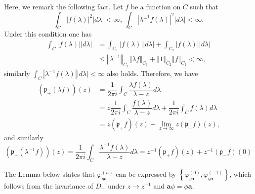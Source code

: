 \documentclass[a4paper]{article}%
\begin{document}
Here, we remark the following fact. Let $f$ be a function on $C$ such that%
\[
\int_{C}\left\vert f\left(  \lambda\right)  \right\vert ^{2}\left\vert
d\lambda\right\vert <\infty\text{, \ }\int_{C}\left\vert \lambda^{\pm
1}f\left(  \lambda\right)  \right\vert ^{2}\left\vert d\lambda\right\vert
<\infty\text{.}%
\]
Under this condition one has%
\begin{align*}
\int_{C}\left\vert f\left(  \lambda\right)  \right\vert \left\vert
d\lambda\right\vert  &  =\int_{C_{1}}\left\vert f\left(  \lambda\right)
\right\vert \left\vert d\lambda\right\vert +\int_{C_{2}}\left\vert f\left(
\lambda\right)  \right\vert \left\vert d\lambda\right\vert \\
&  \leq\left\Vert \lambda^{-1}\right\Vert _{C_{1}}\left\Vert \lambda
f\right\Vert _{C_{1}}+\left\Vert 1\right\Vert _{C_{2}}\left\Vert f\right\Vert
_{C_{2}}<\infty\text{,}%
\end{align*}
similarly $\int_{C}\left\vert \lambda^{-1}f\left(  \lambda\right)  \right\vert
\left\vert d\lambda\right\vert <\infty$ also holds. Therefore, we have%
\begin{align}
\left(  \mathfrak{p}_{+}\left(  \lambda f\right)  \right)  \left(  z\right)
&  =\dfrac{1}{2\pi i}\int_{C}\dfrac{\lambda f\left(  \lambda\right)  }%
{\lambda-z}d\lambda\nonumber\\
&  =z\dfrac{1}{2\pi i}\int_{C}\dfrac{f\left(  \lambda\right)  }{\lambda
-z}d\lambda+\dfrac{1}{2\pi i}\int_{C}f\left(  \lambda\right)  d\lambda
\nonumber\\
&  =z\left(  \mathfrak{p}_{+}f\right)  \left(  z\right)  +\lim_{z\rightarrow
\infty}z\left(  \mathfrak{p}_{-}f\right)  \left(  z\right)  \text{,}
\label{2-21}%
\end{align}
and similarly%
\begin{equation}
\left(  \mathfrak{p}_{+}\left(  \lambda^{-1}f\right)  \right)  \left(
z\right)  =\dfrac{1}{2\pi i}\int_{C}\dfrac{\lambda^{-1}f\left(  \lambda
\right)  }{\lambda-z}d\lambda=z^{-1}\left(  \mathfrak{p}_{+}f\right)  \left(
z\right)  +z^{-1}\left(  \mathfrak{p}_{-}f\right)  \left(  0\right)
\label{2-22}%
\end{equation}


The Lemma below states that $\varphi_{g\boldsymbol{a}}^{\left(  n\right)  }$
can be expressed by $\left\{  \varphi_{g\boldsymbol{a}}^{\left(  0\right)
},\varphi_{g\boldsymbol{a}}^{\left(  -1\right)  }\right\}  $, which follows
from the invariance of $D_{-}$ under $z\rightarrow z^{-1}$ and $\boldsymbol{a}%
\phi=\phi\boldsymbol{a}$.
\end{document}
